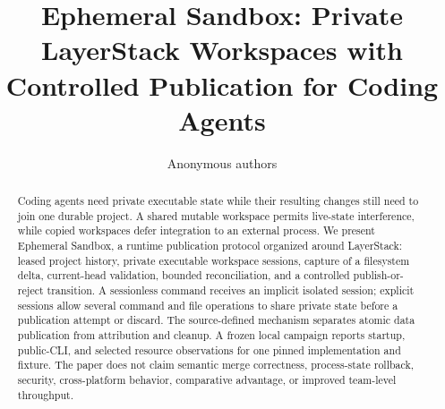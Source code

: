 \documentclass[10pt]{article}
\title{Ephemeral Sandbox: Private LayerStack Workspaces with Controlled Publication for Coding Agents}
\author{Anonymous authors}
\date{}
\begin{document}
\maketitle

\begin{abstract}
Coding agents need private executable state while their resulting changes still
need to join one durable project. A shared mutable workspace permits
live-state interference, while copied workspaces defer integration to an
external process. We present Ephemeral Sandbox, a runtime publication protocol
organized around LayerStack: leased project history, private executable
workspace sessions, capture of a filesystem delta, current-head validation,
bounded reconciliation, and a controlled publish-or-reject transition. A
sessionless command receives an implicit isolated session; explicit sessions
allow several command and file operations to share private state before a
publication attempt or discard. The source-defined mechanism separates atomic
data publication from attribution and cleanup. A frozen local campaign reports
startup, public-CLI, and selected resource observations for one pinned
implementation and fixture. The paper does not claim semantic merge
correctness, process-state rollback, security, cross-platform behavior,
comparative advantage, or improved team-level throughput.
\end{abstract}















\end{document}

